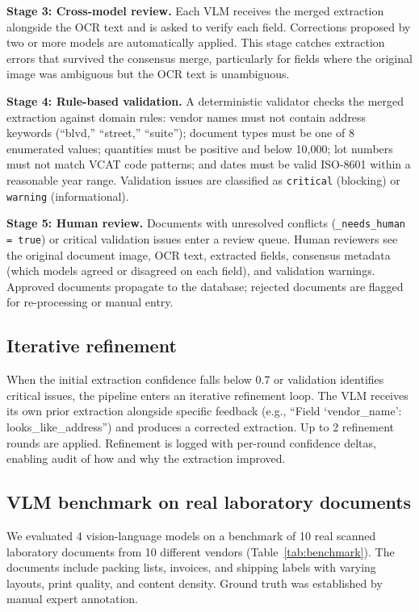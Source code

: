 \documentclass[11pt]{article}
\begin{document}
\textbf{Stage 3: Cross-model review.} Each VLM receives the merged
extraction alongside the OCR text and is asked to verify each field.
Corrections proposed by two or more models are automatically applied.
This stage catches extraction errors that survived the consensus merge,
particularly for fields where the original image was ambiguous but the
OCR text is unambiguous.

\textbf{Stage 4: Rule-based validation.} A deterministic validator checks
the merged extraction against domain rules: vendor names must not contain
address keywords (``blvd,'' ``street,'' ``suite''); document types must
be one of 8 enumerated values; quantities must be positive and below
10,000; lot numbers must not match VCAT code patterns; and dates must be
valid ISO-8601 within a reasonable year range. Validation issues are
classified as \texttt{critical} (blocking) or \texttt{warning}
(informational).

\textbf{Stage 5: Human review.} Documents with unresolved conflicts
(\texttt{\_needs\_human = true}) or critical validation issues enter a
review queue. Human reviewers see the original document image, OCR text,
extracted fields, consensus metadata (which models agreed or disagreed on
each field), and validation warnings. Approved documents propagate to the
database; rejected documents are flagged for re-processing or manual entry.

\subsection{Iterative refinement}
\label{sec:refinement}

When the initial extraction confidence falls below 0.7 or validation
identifies critical issues, the pipeline enters an iterative refinement
loop. The VLM receives its own prior extraction alongside specific
feedback (e.g., ``Field `vendor\_name': looks\_like\_address'') and
produces a corrected extraction. Up to 2 refinement rounds are applied.
Refinement is logged with per-round confidence deltas, enabling audit
of how and why the extraction improved.

\subsection{VLM benchmark on real laboratory documents}
\label{sec:benchmark}

We evaluated 4 vision-language models on a benchmark of 10 real scanned
laboratory documents from 10 different vendors
(Table~\ref{tab:benchmark}). The documents include packing lists,
invoices, and shipping labels with varying layouts, print quality, and
content density. Ground truth was established by manual expert annotation.
\end{document}
